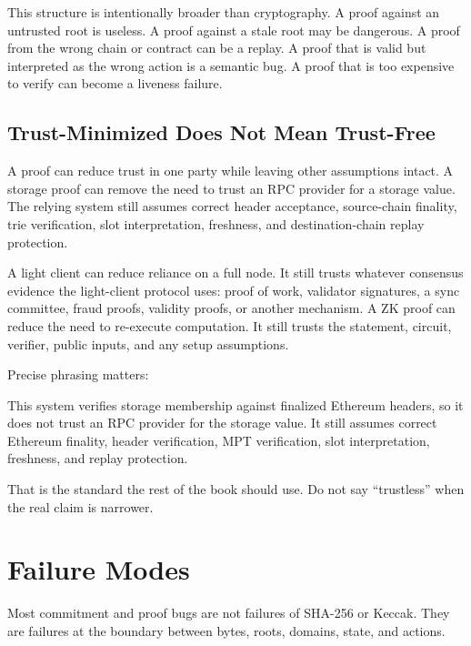 This structure is intentionally broader than cryptography. A proof against an untrusted root is useless. A proof against a stale root may be dangerous. A proof from the wrong chain or contract can be a replay. A proof that is valid but interpreted as the wrong action is a semantic bug. A proof that is too expensive to verify can become a liveness failure.

\subsection{Trust-Minimized Does Not Mean Trust-Free}

A proof can reduce trust in one party while leaving other assumptions intact. A storage proof can remove the need to trust an RPC provider for a storage value. The relying system still assumes correct header acceptance, source-chain finality, trie verification, slot interpretation, freshness, and destination-chain replay protection.

A light client can reduce reliance on a full node. It still trusts whatever consensus evidence the light-client protocol uses: proof of work, validator signatures, a sync committee, fraud proofs, validity proofs, or another mechanism. A ZK proof can reduce the need to re-execute computation. It still trusts the statement, circuit, verifier, public inputs, and any setup assumptions.

Precise phrasing matters:

\begin{codeblock}
This system verifies storage membership against finalized Ethereum headers,
so it does not trust an RPC provider for the storage value.
It still assumes correct Ethereum finality, header verification,
MPT verification, slot interpretation, freshness, and replay protection.
\end{codeblock}

That is the standard the rest of the book should use. Do not say ``trustless'' when the real claim is narrower.

\section{Failure Modes}

Most commitment and proof bugs are not failures of SHA-256 or Keccak. They are failures at the boundary between bytes, roots, domains, state, and actions.

